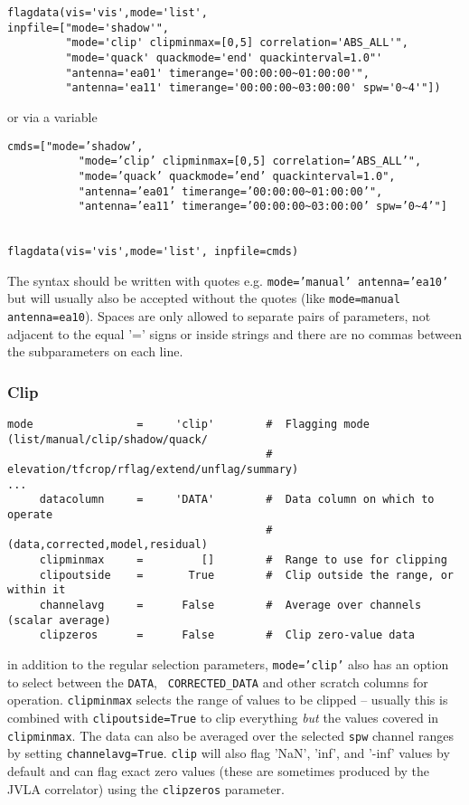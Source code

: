 \small
\begin{verbatim}
flagdata(vis='vis',mode='list',
inpfile=["mode='shadow'",
         "mode='clip' clipminmax=[0,5] correlation='ABS_ALL'",
         "mode='quack' quackmode='end' quackinterval=1.0"'
         "antenna='ea01' timerange='00:00:00~01:00:00'",
         "antenna='ea11' timerange='00:00:00~03:00:00' spw='0~4'"])
\end{verbatim}
\normalsize
or via a variable
\small
\begin{verbatim}
cmds=["mode=’shadow’,
           "mode=’clip’ clipminmax=[0,5] correlation=’ABS_ALL’",
           "mode=’quack’ quackmode=’end’ quackinterval=1.0",
           "antenna=’ea01’ timerange=’00:00:00~01:00:00’",
           "antenna=’ea11’ timerange=’00:00:00~03:00:00’ spw=’0~4’"]


flagdata(vis='vis',mode='list', inpfile=cmds)
\end{verbatim}
\normalsize

The syntax should be written with quotes e.g. {\tt mode='manual'
  antenna='ea10'} but will usually also be accepted without the quotes
(like {\tt mode=manual antenna=ea10}). Spaces are only allowed to
separate pairs of parameters, not adjacent to the equal '=' signs or
inside strings and there are no commas between the subparameters on each line.




\subsubsection{Clip}
\label{section:edit.flagdata.mode.clip}

\small
\begin{verbatim}
mode                =     'clip'        #  Flagging mode (list/manual/clip/shadow/quack/
                                        #  elevation/tfcrop/rflag/extend/unflag/summary)
...
     datacolumn     =     'DATA'        #  Data column on which to operate
                                        #   (data,corrected,model,residual)
     clipminmax     =         []        #  Range to use for clipping
     clipoutside    =       True        #  Clip outside the range, or within it
     channelavg     =      False        #  Average over channels (scalar average)
     clipzeros      =      False        #  Clip zero-value data
\end{verbatim}
\normalsize

in addition to the regular selection parameters, {\tt mode='clip'}
also has an option to select between the {\tt DATA}, {\tt
  CORRECTED\_DATA} and other scratch columns for 
operation. {\tt clipminmax} selects the range of values to be clipped
-- usually this is combined with {\tt clipoutside=True} to clip
everything {\it but} the values covered in {\tt clipminmax}. The data can
also be averaged over the selected {\tt spw} channel ranges by setting
{\tt channelavg=True}. {\tt clip} will also flag 'NaN', 'inf', and
'-inf' values by default and can flag exact zero values (these are sometimes
produced by the JVLA correlator) using the {\tt clipzeros} parameter.


